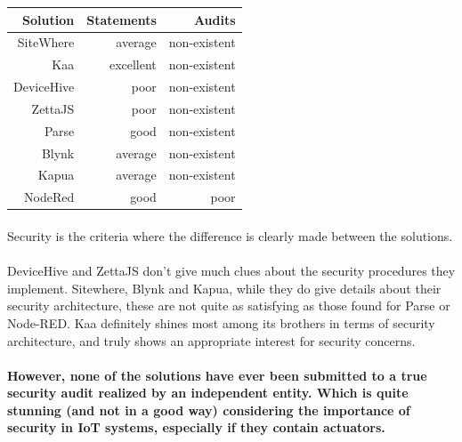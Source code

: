 \documentclass{article}
\begin{document}
\begin{center}
\begin{tabular}{r|r|r}
Solution & Statements & Audits \\ \hline
SiteWhere & \cellcolor{yellow!25}average & \cellcolor{red!25}non-existent \\
Kaa & \cellcolor{green!25}excellent & \cellcolor{red!25}non-existent \\
DeviceHive & \cellcolor{orange!25}poor & \cellcolor{red!25}non-existent \\
ZettaJS & \cellcolor{orange!25}poor & \cellcolor{red!25}non-existent \\
Parse & \cellcolor{blue!10}good & \cellcolor{red!25}non-existent \\
Blynk & \cellcolor{yellow!25}average & \cellcolor{red!25}non-existent \\
Kapua & \cellcolor{yellow!25}average & \cellcolor{red!25}non-existent \\
NodeRed & \cellcolor{blue!10}good & \cellcolor{orange!25}poor \\
\end{tabular}
\end{center}

\paragraph{} Security is the criteria where the difference is clearly made between the solutions.

\paragraph{} DeviceHive and ZettaJS don't give much clues about the security procedures they implement. Sitewhere, Blynk and Kapua, while they do give details about their security architecture, these are not quite as satisfying as those found for Parse or Node-RED. Kaa definitely shines most among its brothers in terms of security architecture, and truly shows an appropriate interest for security concerns.

\paragraph{} \textbf{However, none of the solutions have ever been submitted to a true security audit realized by an independent entity. Which is quite stunning (and not in a good way) considering the importance of security in IoT systems, especially if they contain actuators.}
\end{document}
